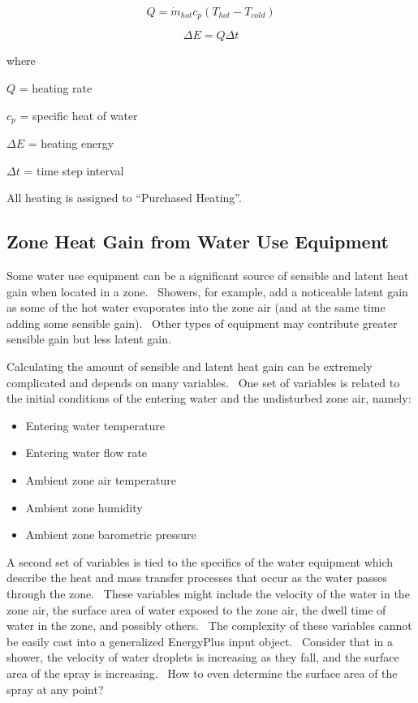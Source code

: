 \begin{equation}
Q = {\dot m_{hot}}{c_p}\left( {{T_{hot}} - {T_{cold}}} \right)
\end{equation}

\begin{equation}
\Delta E = Q\Delta t
\end{equation}

where

\(Q\) = heating rate

\({c_p}\) = specific heat of water

\(\Delta E\) = heating energy

\(\Delta t\) = time step interval

All heating is assigned to ``Purchased Heating''.

\subsection{Zone Heat Gain from Water Use Equipment}\label{zone-heat-gain-from-water-use-equipment}

Some water use equipment can be a significant source of sensible and latent heat gain when located in a zone.~ Showers, for example, add a noticeable latent gain as some of the hot water evaporates into the zone air (and at the same time adding some sensible gain).~ Other types of equipment may contribute greater sensible gain but less latent gain.

Calculating the amount of sensible and latent heat gain can be extremely complicated and depends on many variables.~ One set of variables is related to the initial conditions of the entering water and the undisturbed zone air, namely:

\begin{itemize}
\item
  Entering water temperature
\item
  Entering water flow rate
\item
  Ambient zone air temperature
\item
  Ambient zone humidity
\item
  Ambient zone barometric pressure
\end{itemize}

A second set of variables is tied to the specifics of the water equipment which describe the heat and mass transfer processes that occur as the water passes through the zone.~ These variables might include the velocity of the water in the zone air, the surface area of water exposed to the zone air, the dwell time of water in the zone, and possibly others.~ The complexity of these variables cannot be easily cast into a generalized EnergyPlus input object.~ Consider that in a shower, the velocity of water droplets is increasing as they fall, and the surface area of the spray is increasing.~ How to even determine the surface area of the spray at any point?

